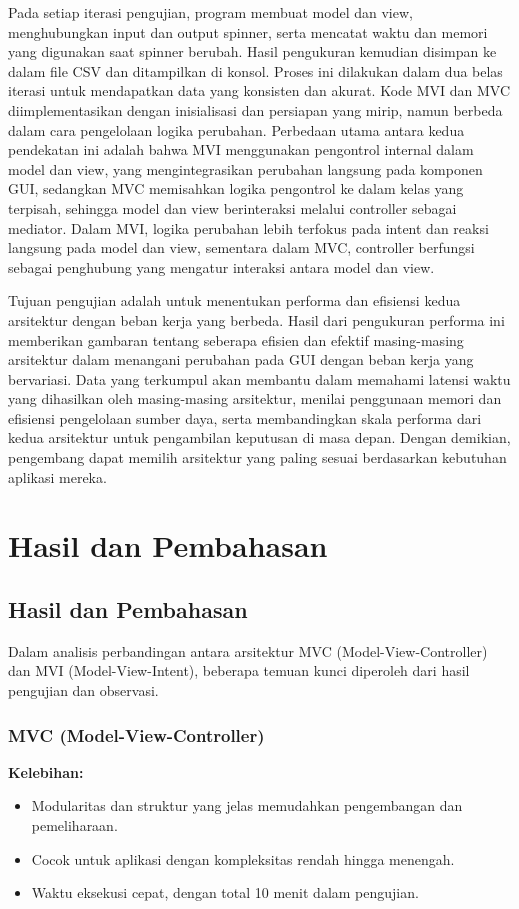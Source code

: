 \documentclass[conference]{IEEEtran}
\begin{document}
Pada setiap iterasi pengujian, program membuat model dan view, menghubungkan input dan output spinner, serta mencatat waktu dan memori yang digunakan saat spinner berubah. Hasil pengukuran kemudian disimpan ke dalam file CSV dan ditampilkan di konsol. Proses ini dilakukan dalam dua belas iterasi untuk mendapatkan data yang konsisten dan akurat. Kode MVI dan MVC diimplementasikan dengan inisialisasi dan persiapan yang mirip, namun berbeda dalam cara pengelolaan logika perubahan.
Perbedaan utama antara kedua pendekatan ini adalah bahwa MVI menggunakan pengontrol internal dalam model dan view, yang mengintegrasikan perubahan langsung pada komponen GUI, sedangkan MVC memisahkan logika pengontrol ke dalam kelas yang terpisah, sehingga model dan view berinteraksi melalui controller sebagai mediator. Dalam MVI, logika perubahan lebih terfokus pada intent dan reaksi langsung pada model dan view, sementara dalam MVC, controller berfungsi sebagai penghubung yang mengatur interaksi antara model dan view.

Tujuan pengujian adalah untuk menentukan performa dan efisiensi kedua arsitektur dengan beban kerja yang berbeda. Hasil dari pengukuran performa ini memberikan gambaran tentang seberapa efisien dan efektif masing-masing arsitektur dalam menangani perubahan pada GUI dengan beban kerja yang bervariasi. Data yang terkumpul akan membantu dalam memahami latensi waktu yang dihasilkan oleh masing-masing arsitektur, menilai penggunaan memori dan efisiensi pengelolaan sumber daya, serta membandingkan skala performa dari kedua arsitektur untuk pengambilan keputusan di masa depan. Dengan demikian, pengembang dapat memilih arsitektur yang paling sesuai berdasarkan kebutuhan aplikasi mereka.

\section{Hasil dan Pembahasan}

\subsection{Hasil dan Pembahasan}
Dalam analisis perbandingan antara arsitektur MVC (Model-View-Controller) dan MVI (Model-View-Intent), beberapa temuan kunci diperoleh dari hasil pengujian dan observasi.

\subsubsection{MVC (Model-View-Controller)}
\textbf{Kelebihan:}
\begin{itemize}
    \item Modularitas dan struktur yang jelas memudahkan pengembangan dan pemeliharaan.
    \item Cocok untuk aplikasi dengan kompleksitas rendah hingga menengah.
    \item Waktu eksekusi cepat, dengan total 10 menit dalam pengujian.
\end{itemize}
\end{document}
